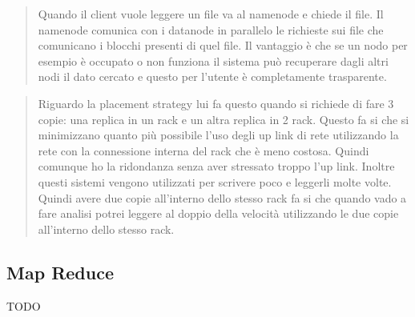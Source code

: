 \documentclass[italian,]{article}
\begin{document}
\begin{quote}
Quando il client vuole leggere un file va al namenode e chiede il file.
Il namenode comunica con i datanode in parallelo le richieste sui file
che comunicano i blocchi presenti di quel file. Il vantaggio è che se un
nodo per esempio è occupato o non funziona il sistema può recuperare
dagli altri nodi il dato cercato e questo per l'utente è completamente
trasparente.
\end{quote}

\begin{quote}
Riguardo la placement strategy lui fa questo quando si richiede di fare
3 copie: una replica in un rack e un altra replica in 2 rack. Questo fa
si che si minimizzano quanto più possibile l'uso degli up link di rete
utilizzando la rete con la connessione interna del rack che è meno
costosa. Quindi comunque ho la ridondanza senza aver stressato troppo
l'up link. Inoltre questi sistemi vengono utilizzati per scrivere poco e
leggerli molte volte. Quindi avere due copie all'interno dello stesso
rack fa si che quando vado a fare analisi potrei leggere al doppio della
velocità utilizzando le due copie all'interno dello stesso rack.
\end{quote}

\subsection{Map Reduce}\label{map-reduce}

TODO
\end{document}
